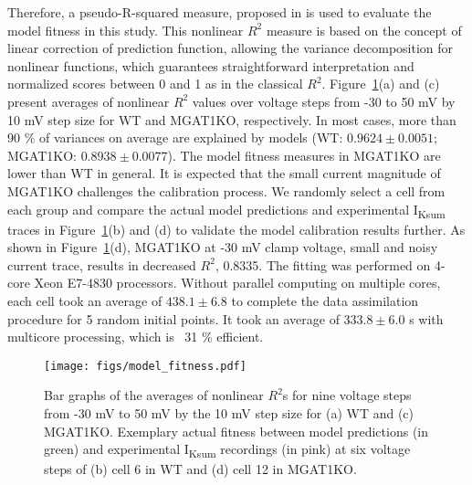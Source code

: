 \documentclass[11pt]{article}
\begin{document}
Therefore, a pseudo-R-squared measure, proposed in \citep{li2019prediction} is used to evaluate the model fitness in this study. This nonlinear $R^{2}$ measure is based on the concept of linear correction of prediction function, allowing the variance decomposition for nonlinear functions, which guarantees straightforward interpretation and normalized scores between 0 and 1 as in the classical $R^{2}$. Figure~\ref{fig:model_fitness}(a) and (c) present averages of nonlinear $R^{2}$ values over voltage steps from -30 to 50 mV by 10 mV step size for WT and MGAT1KO, respectively. In most cases, more than 90 \% of variances on average are explained by models (WT: $0.9624 \pm 0.0051$; MGAT1KO: $0.8938 \pm 0.0077$). The model fitness measures in MGAT1KO are lower than WT in general. It is expected that the small current magnitude of MGAT1KO challenges the calibration process. We randomly select a cell from each group and compare the actual model predictions and experimental I\textsubscript{Ksum} traces in Figure~\ref{fig:model_fitness}(b) and (d) to validate the model calibration results further. As shown in Figure~\ref{fig:model_fitness}(d), MGAT1KO at -30 mV clamp voltage, small and noisy current trace, results in decreased $R^{2}$, 0.8335. The fitting was performed on 4-core Xeon E7-4830 processors. Without parallel computing on multiple cores, each cell took an average of $438.1 \pm 6.8$ to complete the data assimilation procedure for 5 random initial points. It took an average of $333.8 \pm 6.0$ s with multicore processing, which is ~31 \% efficient.
\begin{figure}[!ht]
    \centering
    \texttt{[image: figs/model\_fitness.pdf]}
    \caption{Bar graphs of the averages of nonlinear $R^{2}$s for nine voltage steps from -30 mV to 50 mV by the 10 mV step size for (a) WT and (c) MGAT1KO. Exemplary actual fitness between model predictions (in green) and experimental I\textsubscript{Ksum} recordings (in pink) at six voltage steps of (b) cell 6 in WT and (d) cell 12 in MGAT1KO.}
    \label{fig:model_fitness}
\end{figure}
\end{document}
